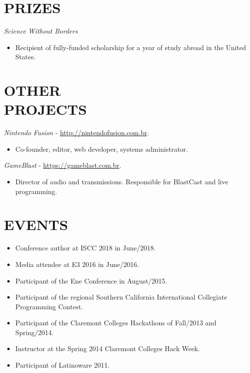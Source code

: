 \documentclass[margin]{res}
\begin{document}
\begin{resume}
		\section{PRIZES}
			{\sl Science Without Borders}
			\begin{itemize}
				\item[] Recipient of fully-funded scholarship for a year of study abroad in the United States.
			\end{itemize}

			
		\section{OTHER \\ PROJECTS}
			{\sl Nintendo Fusion} - \href{http://nintendofusion.com.br}{http://nintendofusion.com.br}.
			\begin{itemize}
				\item[] Co-founder, editor, web developer, systems administrator.
			\end{itemize}
			{\sl GameBlast} - \href{https://gameblast.com.br}{https://gameblast.com.br}.
			\begin{itemize}
				\item[] Director of audio and transmissions. Responsible for BlastCast and live programming.
			\end{itemize}
		
		\section{EVENTS}
			\begin{itemize}
				\item[] Conference author at ISCC 2018 in June/2018.
				\item[] Media attendee at E3 2016 in June/2016.
				\item[] Participant of the Ene Conference in August/2015.
				\item[] Participant of the regional Southern California International Collegiate Programming Contest.
				\item[] Participant of the Claremont Colleges Hackathons of Fall/2013 and Spring/2014.
				\item[] Instructor at the Spring 2014 Claremont Colleges Hack Week.
				\item[] Participant of Latinoware 2011.
			\end{itemize}


\end{resume}
\end{document}
